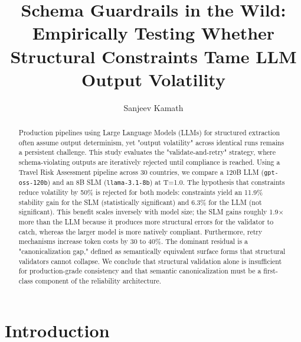 \documentclass[sigconf]{acmart}
\begin{document}
\title{Schema Guardrails in the Wild: Empirically Testing Whether\\Structural Constraints Tame LLM Output Volatility}

\author{Sanjeev Kamath}

\begin{abstract}
Production pipelines using Large Language Models (LLMs) for structured extraction often assume output determinism, yet "output volatility" across identical runs remains a persistent challenge. This study evaluates the "validate-and-retry" strategy, where schema-violating outputs are iteratively rejected until compliance is reached. Using a Travel Risk Assessment pipeline across 30 countries, we compare a 120B LLM (\texttt{gpt-oss-\allowbreak 120b}) and an 8B SLM (\texttt{llama-3.1-\allowbreak 8b}) at T=1.0. The hypothesis that constraints reduce volatility by 50\% is rejected for both models: constraints yield an 11.9\% stability gain for the SLM (statistically significant) and 6.3\% for the LLM (not significant). This benefit scales inversely with model size; the SLM gains roughly 1.9× more than the LLM because it produces more structural errors for the validator to catch, whereas the larger model is more natively compliant. Furthermore, retry mechanisms increase token costs by 30 to 40\%. The dominant residual is a "canonicalization gap," defined as semantically equivalent surface forms that structural validators cannot collapse. We conclude that structural validation alone is insufficient for production-grade consistency and that semantic canonicalization must be a first-class component of the reliability architecture.
\end{abstract}

\maketitle
{}

\section{Introduction}
\end{document}
